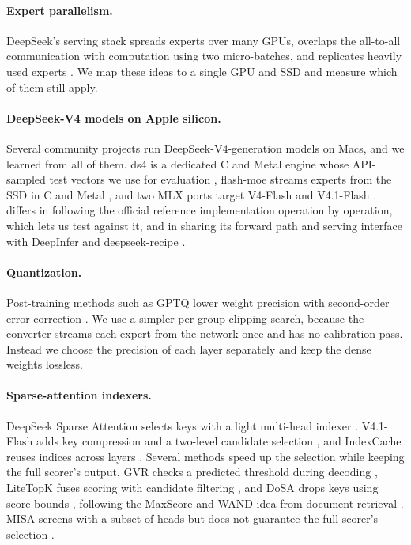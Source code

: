 \paragraph{Expert parallelism.} DeepSeek's serving stack spreads experts over many GPUs, overlaps the all-to-all communication with computation using two micro-batches, and replicates heavily used experts \citep{deepseekv3,deepinfer}. We map these ideas to a single GPU and SSD and measure which of them still apply.

\paragraph{DeepSeek-V4 models on Apple silicon.} Several community projects run DeepSeek-V4-generation models on Macs, and we learned from all of them. ds4 is a dedicated C and Metal engine whose API-sampled test vectors we use for evaluation \citep{ds4}, flash-moe streams experts from the SSD in C and Metal \citep{flashmoe}, and two MLX ports target V4-Flash and V4.1-Flash \citep{ssdmoe,pipenetwork}. \method{} differs in following the official reference implementation operation by operation, which lets us test against it, and in sharing its forward path and serving interface with DeepInfer \citep{deepinfer} and deepseek-recipe \citep{deepseekrecipe}.

\paragraph{Quantization.} Post-training methods such as GPTQ lower weight precision with second-order error correction \citep{gptq}. We use a simpler per-group clipping search, because the converter streams each expert from the network once and has no calibration pass. Instead we choose the precision of each layer separately and keep the dense weights lossless.

\paragraph{Sparse-attention indexers.} DeepSeek Sparse Attention selects keys with a light multi-head indexer \citep{deepseek32}. V4.1-Flash adds key compression and a two-level candidate selection \citep{deepseek41flash}, and IndexCache reuses indices across layers \citep{indexcache}. Several methods speed up the selection while keeping the full scorer's output. GVR checks a predicted threshold during decoding \citep{gvr}, LiteTopK fuses scoring with candidate filtering \citep{litetopk}, and DoSA drops keys using score bounds \citep{dosa}, following the MaxScore and WAND idea from document retrieval \citep{maxscore1995,wand2003}. MISA screens with a subset of heads but does not guarantee the full scorer's selection \citep{misa}.
